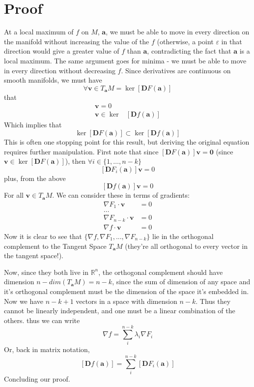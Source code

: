 \documentclass[11pt]{article}
\theoremstyle{definition}
\begin{document}
\section{Proof}
At a local maximum of $f$ on $M$, $\mathbf{a}$, we must be able to move in every direction on the 
manifold without increasing the value of the $f$ (otherwise, a point $\varepsilon$ in that direction
would give a greater value of $f$ than $\mathbf{a}$, contradicting the fact that $\mathbf{a}$ is a
local maximum. The same argument goes for minima - we must be able to move in every direction without
decreasing $f$. Since derivatives are continuous on smooth manifolds, we must have 
    \[\forall \mathbf{v} \in T_{\mathbf{a}}M = \ker[\mathbf{D}F(\mathbf{a})] \]
that 
    \begin{align*}
    [\mathbf{D}f(\mathbf{a})&]\mathbf{v} = 0  \\
    \mathbf{v} \in \ker&[\mathbf{D}f(\mathbf{a})] 
    \end{align*}
Which implies that
    \[\ker[\mathbf{D}F(\mathbf{a})] \subset  \ker[\mathbf{D}f(\mathbf{a})] \]
This is often one stopping point for this result, but deriving the original equation requires further 
manipulation. First note that since $[\mathbf{D}F(\mathbf{a})]\mathbf{v} = \mathbf{0}$ (since 
$\mathbf{v} \in \ker[\mathbf{D}F(\mathbf{a})]$), then $\forall i \in \{1, \dots,  n-k\}$
    \[ [\mathbf{D}F_i(\mathbf{a})]\mathbf{v} = 0 \]
plus, from the above 
    \[ [\mathbf{D}f(\mathbf{a})]\mathbf{v} = 0 \] 
For all $\mathbf{v} \in T_{\mathbf{a}}M$. We can consider these in terms of gradients:
\begin{align*}
    \nabla F_1 \cdot \mathbf{v} &= 0  \\
    \dots \\
    \nabla F_{n-k} \cdot \mathbf{v} &= 0 \\
    \nabla f \cdot \mathbf{v} &= 0 
\end{align*}
Now it is clear to see that $\{\nabla f, \nabla F_1, ..., \nabla F_{n-k}\}$ lie in the orthogonal complement
to the Tangent Space $T_{\mathbf{a}}M$ (they're all orthogonal to every vector in the tangent space!). 

Now, since they both live in $\mathbb{R}^n$, the orthogonal complement
should have dimension $n - dim(T_{\mathbf{a}}M) = n - k$, since the sum of dimension of any space and 
it's orthogonal complement must be the dimension of the space it's embedded in. Now we have $n-k+1$ 
vectors in a space with dimension $n-k$. Thus they cannot be linearly independent, and one must be a linear 
combination of the others. thus we can write
    \[ \nabla f = \sum_i^{n-k} \lambda_i \nabla F_i \]
Or, back in matrix notation,
    \[ [\mathbf{D}f(\mathbf{a})] = \sum_i^{n-k} [\mathbf{D}F_i(\mathbf{a})] \]
Concluding our proof.
\end{document}
